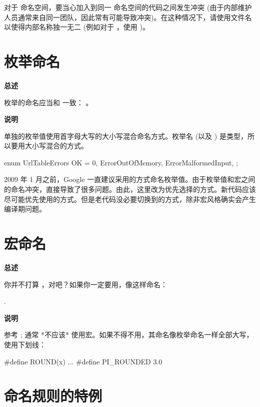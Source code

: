 对于  命名空间，要当心加入到同一  命名空间的代码之间发生冲突 (由于内部维护人员通常来自同一团队，因此常有可能导致冲突)。在这种情况下，请使用文件名以使得内部名称独一无二 (例如对于 ，使用 )。

\section{枚举命名}

\textbf{总述}

枚举的命名应当和  一致： 。

\textbf{说明}

单独的枚举值使用首字母大写的大小写混合命名方式。枚举名  (以及 ) 是类型，所以要用大小写混合的方式。

\begin{cppcode}
  enum UrlTableErrors {
      OK = 0,
      ErrorOutOfMemory,
      ErrorMalformedInput,
    };
\end{cppcode}

2009 年 1 月之前，Google 一直建议采用的方式命名枚举值。由于枚举值和宏之间的命名冲突，直接导致了很多问题。由此，这里改为优先选择的方式。新代码应该尽可能优先使用的方式。但是老代码没必要切换到的方式，除非宏风格确实会产生编译期问题。

\section{宏命名} \label{macro-names}

\textbf{总述}

你并不打算 ，对吧？如果你一定要用，像这样命名：

.

\textbf{说明}

参考 ; 通常 *不应该* 使用宏。如果不得不用，其命名像枚举命名一样全部大写，使用下划线：

\begin{cppcode}
  #define ROUND(x) ...
  #define PI_ROUNDED 3.0
\end{cppcode}

\section{命名规则的特例}

